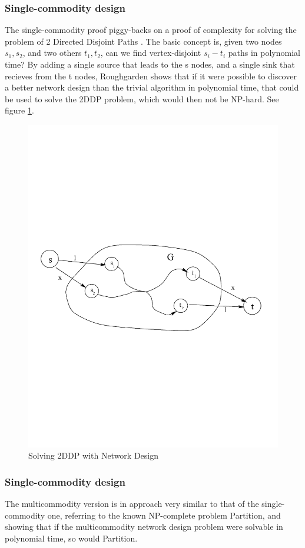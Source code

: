 \documentclass[a4paper,12pt]{article}
\begin{document}
\subsubsection*{Single-commodity design}

The single-commodity proof piggy-backs on a proof of complexity for solving the problem of 2 Directed Disjoint Paths \cite{fortune}. The basic concept is, given two nodes $s_1, s_2$, and two others $t_1, t_2$, can we find vertex-disjoint $s_i-t_i$ paths in polynomial time? By adding a single source that leads to the s nodes, and a single sink that recieves from the t nodes, Roughgarden shows that if it were possible to discover a better network design than the trivial algorithm in polynomial time, that could be used to solve the 2DDP problem, which would then not be NP-hard. See figure \ref{fig:2DDP}.
 
\begin{figure}
  \includegraphics[width=\linewidth]{figures/cropped_proof-of-4-3-bounds.pdf}
  \caption{Solving 2DDP with Network Design}
  \label{fig:2DDP}
\end{figure}


\subsubsection*{Single-commodity design}
The multicommodity version is in approach very similar to that of the single-commodity one, referring to the known NP-complete problem Partition, and showing that if the multicommodity network design problem were solvable in polynomial time, so would Partition. 


\printbibliography
\end{document}
